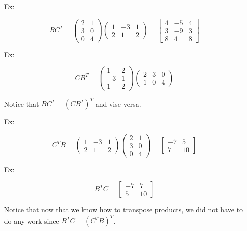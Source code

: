 \documentclass[reqno]{amsart}
\theoremstyle{definition}
\begin{document}
\begin{itemize}

\item[Ex:  ]

\begin{equation*}
BC^T = \begin{pmatrix}
2 & 1\\
3 & 0\\
0 & 4
\end{pmatrix}\begin{pmatrix}
1 & -3 & 1\\
2 & 1 & 2
\end{pmatrix} = \begin{bmatrix}
4 & -5 & 4\\
3 & -9 & 3\\
8 & 4 & 8
\end{bmatrix}
\end{equation*}

\item[Ex:  ]  

\begin{equation*}
CB^T = \begin{pmatrix}
1 & 2\\
-3 & 1\\
1 & 2
\end{pmatrix}\begin{pmatrix}
2 & 3 & 0\\
1 & 0 & 4
\end{pmatrix}
\end{equation*}

Notice that $BC^T = (CB^T)^T$ and vise-versa.

\item[Ex:  ]  

\begin{equation*}
C^TB = \begin{pmatrix}
1 & -3 & 1\\
2 & 1 & 2
\end{pmatrix}\begin{pmatrix}
2 & 1\\
3 & 0\\
0 & 4
\end{pmatrix} = \begin{bmatrix}
-7 & 5\\
7 & 10
\end{bmatrix}
\end{equation*}

\item[Ex:  ]

\begin{equation*}
B^TC = \begin{bmatrix}
-7 & 7\\
5 & 10
\end{bmatrix}
\end{equation*}

Notice that now that we know how to transpose products, we did not have to do any work
since $B^TC = (C^TB)^T$.

\end{itemize}
\end{document}
